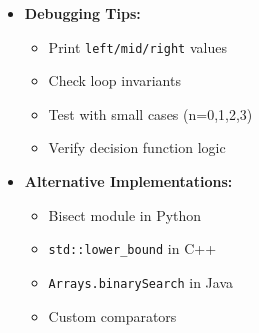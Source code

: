 \documentclass[a4paper,10pt]{book}
\begin{document}
\begin{itemize}
    \item \textbf{Debugging Tips:}
    \begin{itemize}
        \item Print \texttt{left/mid/right} values
        \item Check loop invariants
        \item Test with small cases (n=0,1,2,3)
        \item Verify decision function logic
    \end{itemize}
    
    \item \textbf{Alternative Implementations:}
    \begin{itemize}
        \item Bisect module in Python
        \item \texttt{std::lower\_bound} in C++
        \item \texttt{Arrays.binarySearch} in Java
        \item Custom comparators
    \end{itemize}
\end{itemize}
\end{document}
